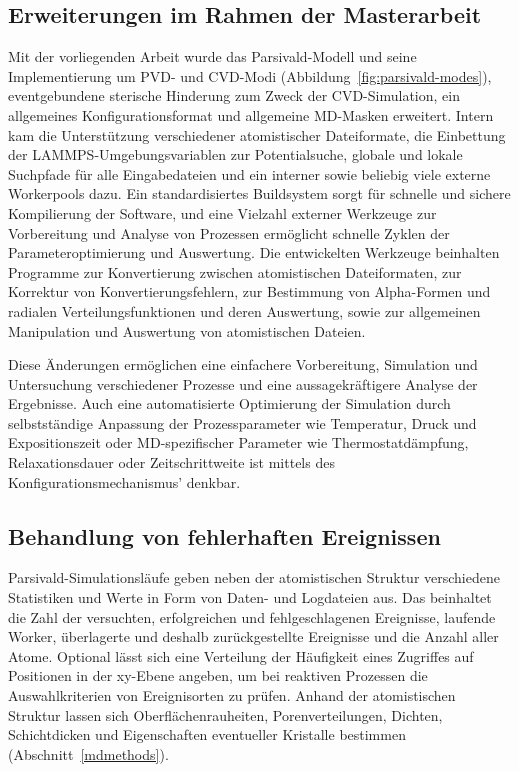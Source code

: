 \subsection{Erweiterungen im Rahmen der Masterarbeit}

Mit der vorliegenden Arbeit wurde das Parsivald-Modell und seine Implementierung um PVD- und CVD-Modi (Abbildung~\ref{fig:parsivald-modes}), eventgebundene sterische Hinderung zum Zweck der CVD-Simu\-lation, ein allgemeines Konfigurationsformat und allgemeine MD-Masken erweitert.
Intern kam die Unterstützung verschiedener atomistischer Dateiformate, die Einbettung der LAMMPS-Umgebungs\-variablen zur Potentialsuche, globale und lokale Suchpfade für alle Eingabedateien und ein interner sowie beliebig viele externe Workerpools dazu.
Ein standardisiertes Buildsystem sorgt für schnelle und sichere Kompilierung der Software, und eine Vielzahl externer Werkzeuge zur Vorbereitung und Analyse von Prozessen ermöglicht schnelle Zyklen der Parameteroptimierung und Auswertung.
Die entwickelten Werkzeuge beinhalten Programme zur Konvertierung zwischen atomistischen Dateiformaten, zur Korrektur von Konvertierungsfehlern, zur Bestimmung von Alpha-Formen und radialen Verteilungsfunktionen und deren Auswertung, sowie zur allgemeinen Manipulation und Auswertung von atomistischen Dateien.

Diese Änderungen ermöglichen eine einfachere Vorbereitung, Simulation und Untersuchung verschiedener Prozesse und eine aussagekräftigere Analyse der Ergebnisse.
Auch eine automatisierte Optimierung der Simulation durch selbstständige Anpassung der Prozessparameter wie Temperatur, Druck und Expositionszeit oder MD-spezifischer Parameter wie Thermostatdämpfung, Relaxationsdauer oder Zeitschrittweite ist mittels des Konfigurationsmechanismus' denkbar.


\subsection{Behandlung von fehlerhaften Ereignissen}

Parsivald-Simulationsläufe geben neben der atomistischen Struktur verschiedene Statistiken und Werte in Form von Daten- und Logdateien aus.
Das beinhaltet die Zahl der versuchten, erfolgreichen und fehlgeschlagenen Ereignisse, laufende Worker, überlagerte und deshalb zurückgestellte Ereignisse und die Anzahl aller Atome.
Optional lässt sich eine Verteilung der Häufigkeit eines Zugriffes auf Positionen in der xy-Ebene angeben, um bei reaktiven Prozessen die Auswahlkriterien von Ereignisorten zu prüfen.
Anhand der atomistischen Struktur lassen sich Oberflächenrauheiten, Porenverteilungen, Dichten, Schichtdicken und Eigenschaften eventueller Kristalle bestimmen (Abschnitt~\ref{mdmethods}).

